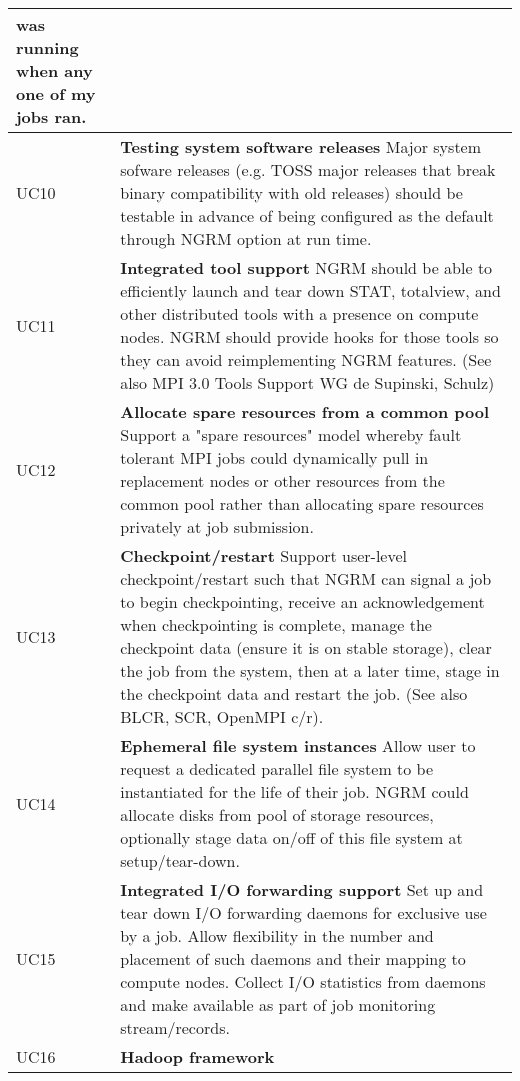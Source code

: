 \begin{longtable}{|p{1cm}|p{15cm}|}
	was running when any one of my jobs ran.\\
  \hline
  UC10 & \textbf{Testing system software releases}\newline
	Major system sofware releases (e.g. TOSS major releases that break
	binary compatibility with old releases) should be testable in advance
	of being configured as the default through NGRM option at run time.\\
  \hline
  UC11 & \textbf{Integrated tool support}\newline
	NGRM should be able to efficiently launch and tear down STAT,
	totalview, and other distributed tools with a presence on compute
	nodes. NGRM should provide hooks for those tools so they can avoid
	reimplementing NGRM features. (See also MPI 3.0 Tools Support WG de
	Supinski, Schulz)\\
  \hline
  UC12 & \textbf{Allocate spare resources from a common pool}\newline
	Support a "spare resources" model whereby fault tolerant MPI jobs
	could dynamically pull in replacement nodes or other resources from
	the common pool rather than allocating spare resources privately at
	job submission.\\
  \hline
  UC13 & \textbf{Checkpoint/restart}\newline
	Support user-level checkpoint/restart such that NGRM can signal a
	job to begin checkpointing, receive an acknowledgement when
	checkpointing is complete, manage the checkpoint data (ensure it is
	on stable storage), clear the job from the system, then at a later
	time, stage in the checkpoint data and restart the job. (See also
	BLCR, SCR, OpenMPI c/r).\\
  \hline
  UC14 & \textbf{Ephemeral file system instances}\newline
	Allow user to request a dedicated parallel file system to be
	instantiated for the life of their job. NGRM could allocate disks
	from pool of storage resources, optionally stage data on/off of this
	file system at setup/tear-down.\\
  \hline
  UC15 & \textbf{Integrated I/O forwarding support}\newline
	Set up and tear down I/O forwarding daemons for exclusive use by
	a job. Allow flexibility in the number and placement of such daemons
	and their mapping to compute nodes. Collect I/O statistics from
	daemons and make available as part of job monitoring stream/records.\\
  \hline
  UC16 & \textbf{Hadoop framework}\newline

\end{longtable}
